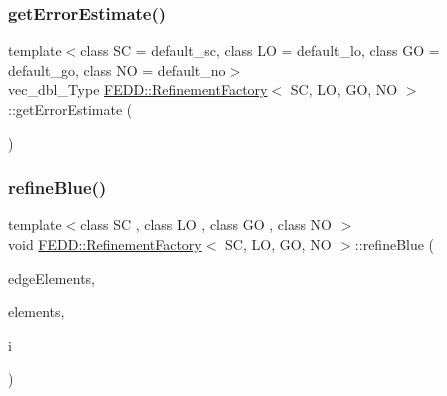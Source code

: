 \subsubsection{\texorpdfstring{get\+Error\+Estimate()}{getErrorEstimate()}}
{\footnotesize\ttfamily template$<$class SC = default\+\_\+sc, class LO = default\+\_\+lo, class GO = default\+\_\+go, class NO = default\+\_\+no$>$ \\
vec\+\_\+dbl\+\_\+\+Type \hyperlink{classFEDD_1_1RefinementFactory}{F\+E\+D\+D\+::\+Refinement\+Factory}$<$ SC, LO, GO, NO $>$\+::get\+Error\+Estimate (\begin{DoxyParamCaption}{ }\end{DoxyParamCaption})\hspace{0.3cm}{\ttfamily [inline]}}

\mbox{\label{classFEDD_1_1RefinementFactory_aeeebbc6bfb22dfb14470cf628400733a}} 
\subsubsection{\texorpdfstring{refine\+Blue()}{refineBlue()}}
{\footnotesize\ttfamily template$<$class SC , class LO , class GO , class NO $>$ \\
void \hyperlink{classFEDD_1_1RefinementFactory}{F\+E\+D\+D\+::\+Refinement\+Factory}$<$ SC, LO, GO, NO $>$\+::refine\+Blue (\begin{DoxyParamCaption}\item[{\hyperlink{classFEDD_1_1RefinementFactory_ae5285e990ec4632d6188a1280627ad13}{Edge\+Elements\+Ptr\+\_\+\+Type}}]{edge\+Elements,  }\item[{\hyperlink{classFEDD_1_1RefinementFactory_a0994b5b7b6d080048673941251999f2e}{Elements\+Ptr\+\_\+\+Type}}]{elements,  }\item[{int}]{i }\end{DoxyParamCaption})}

\mbox{\label{classFEDD_1_1RefinementFactory_a130f21212d5edaad2dc8f809a2628f2a}} 
